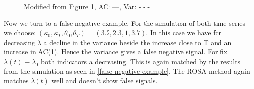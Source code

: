 \documentclass[%
thesis=student,%
coverpage=false,%
titlepage=false,%
headmarks=true, %
english,%
font=libertine, %
math=newpxtx, %
BCOR=5mm,%
coverBCOR=11mm%
]{tumbook}
\begin{document}
\begin{figure}
\begin{minipage}{0.49\textwidth}
    \end{minipage}
    \begin{minipage}{\textwidth}
    \centering
    \caption{Modified from \cite{Morr:2024} Figure 1, AC: ---, Var: - - -}
    \label{false positive example}
    \end{minipage}
\end{figure}


Now we turn to a false negative example. For the simulation of both time series we choose: $(\kappa_{0},\kappa_{T},\theta_{0},\theta_{T}) = (3.2,2.3,1,3.7)$. In this case we have for decreasing $\lambda$ a decline in the variance beside the increase close to T and an increase in AC(1). Hence the variance gives a false negative signal. For fix $\lambda(t) \equiv \lambda_{0}$ both indicators a decreasing. This is again matched by the results from the simulation as seen in \ref{false negative example}. The ROSA method again matches $\lambda(t)$ well and doesn't show false signals.
\end{document}
